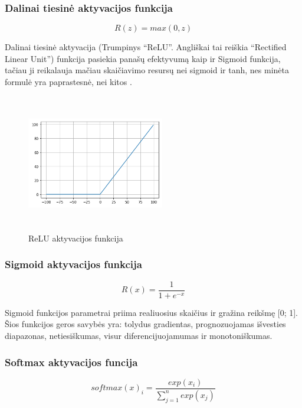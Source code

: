 \documentclass{VUMIFInfKursinis}
\begin{document}
\subsubsection{Dalinai tiesinė aktyvacijos funkcija}
\begin{equation}
  R(z) = max(0, z)
\end{equation}

\par
Dalinai tiesinė aktyvacija (Trumpinys \enquote{ReLU}. Angliškai tai reiškia \enquote{Rectified Linear Unit}) funkcija pasiekia panašų efektyvumą
kaip ir Sigmoid funkcija, tačiau ji reikalauja mačiau skaičiavimo resursų nei sigmoid
ir tanh, nes minėta formulė yra paprastesnė, nei kitos \cite{salt16}.

\begin{figure}[ht]
  \centering
  \includegraphics[width=6cm,height=6cm,keepaspectratio]{relu.png}
  \caption{ReLU aktyvacijos funkcija}
  \label{fig:relu}
\end{figure}

\subsubsection{Sigmoid aktyvacijos funkcija}
\begin{equation}
  R(x) = \frac{1}{1 + e^{-x}}
\end{equation}

\par
Sigmoid funkcijos parametrai priima realiuosius skaičius ir gražina reikšmę [0; 1].
Šios funkcijos geros savybės yra: tolydus gradientas, prognozuojamas išvesties
diapazonas, netiesiškumas, visur diferencijuojamumas ir monotoniškumas. \cite{salt16}

\subsubsection{Softmax aktyvacijos funcija}
\begin{equation}
  softmax(x)_i = \frac{exp(x_i)}{\displaystyle \sum_{j=1}^{n}exp(x_j)}
\end{equation}
\end{document}
